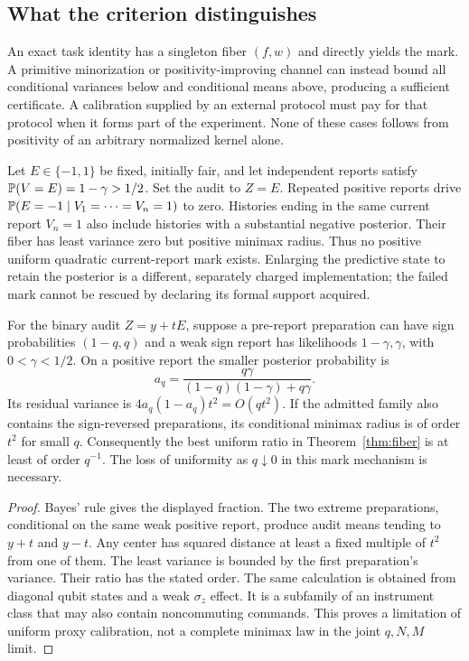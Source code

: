 \subsection*{What the criterion distinguishes}
An exact task identity has a singleton fiber $(f,w)$ and directly yields the mark. A primitive minorization or positivity-improving channel can instead bound all conditional variances below and conditional means above, producing a sufficient certificate. A calibration supplied by an external protocol must pay for that protocol when it forms part of the experiment. None of these cases follows from positivity of an arbitrary normalized kernel alone.

\begin{example}\label{ex:calibration-failure}
Let $E\in\{-1,1\}$ be fixed, initially fair, and let independent reports satisfy $\mathbb P(V=E)=1-\gamma>1/2$. Set the audit to $Z=E$. Repeated positive reports drive $\mathbb P(E=-1\mid V_1=\cdots=V_n=1)$ to zero. Histories ending in the same current report $V_n=1$ also include histories with a substantial negative posterior. Their fiber has least variance zero but positive minimax radius. Thus no positive uniform quadratic current-report mark exists. Enlarging the predictive state to retain the posterior is a different, separately charged implementation; the failed mark cannot be rescued by declaring its formal support acquired.
\end{example}

\begin{proposition}\label{prop:q-sharp}
For the binary audit $Z=y+tE$, suppose a pre-report preparation can have sign probabilities $(1-q,q)$ and a weak sign report has likelihoods $1-\gamma,\gamma$, with $0<\gamma<1/2$. On a positive report the smaller posterior probability is
\[
 a_q=\frac{q\gamma}{(1-q)(1-\gamma)+q\gamma}.
\]
Its residual variance is $4a_q(1-a_q)t^2=O(qt^2)$. If the admitted family also contains the sign-reversed preparations, its conditional minimax radius is of order $t^2$ for small $q$. Consequently the best uniform ratio in Theorem~\ref{thm:fiber} is at least of order $q^{-1}$. The loss of uniformity as $q\downarrow0$ in this mark mechanism is necessary.
\end{proposition}
\begin{proof}
Bayes' rule gives the displayed fraction. The two extreme preparations, conditional on the same weak positive report, produce audit means tending to $y+t$ and $y-t$. Any center has squared distance at least a fixed multiple of $t^2$ from one of them. The least variance is bounded by the first preparation's variance. Their ratio has the stated order. The same calculation is obtained from diagonal qubit states and a weak $\sigma_z$ effect. It is a subfamily of an instrument class that may also contain noncommuting commands. This proves a limitation of uniform proxy calibration, not a complete minimax law in the joint $q,N,M$ limit.
\end{proof}
